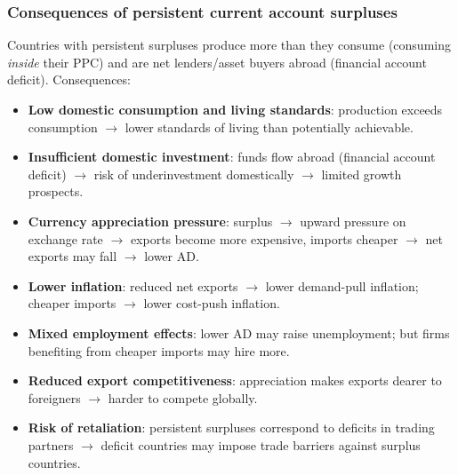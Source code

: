 \documentclass[a4paper,12pt]{article}
\begin{document}
\subsubsection*{Consequences of persistent current account surpluses}
Countries with persistent surpluses produce more than they consume (consuming \textit{inside} their PPC) and are net lenders/asset buyers abroad (financial account deficit). Consequences:
\begin{itemize}
  \item \textbf{Low domestic consumption and living standards}: production exceeds consumption $\to$ lower standards of living than potentially achievable.
  \item \textbf{Insufficient domestic investment}: funds flow abroad (financial account deficit) $\to$ risk of underinvestment domestically $\to$ limited growth prospects.
  \item \textbf{Currency appreciation pressure}: surplus $\to$ upward pressure on exchange rate $\to$ exports become more expensive, imports cheaper $\to$ net exports may fall $\to$ lower AD.
  \item \textbf{Lower inflation}: reduced net exports $\to$ lower demand-pull inflation; cheaper imports $\to$ lower cost-push inflation.
  \item \textbf{Mixed employment effects}: lower AD may raise unemployment; but firms benefiting from cheaper imports may hire more.
  \item \textbf{Reduced export competitiveness}: appreciation makes exports dearer to foreigners $\to$ harder to compete globally.
  \item \textbf{Risk of retaliation}: persistent surpluses correspond to deficits in trading partners $\to$ deficit countries may impose trade barriers against surplus countries.
\end{itemize}
\end{document}
